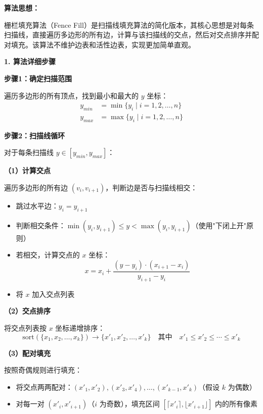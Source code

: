 ﻿\documentclass[12pt,a4paper]{article}
\begin{document}
\begin{tcolorbox}[breakable]
\textbf{算法思想：}

栅栏填充算法（Fence Fill）是扫描线填充算法的简化版本，其核心思想是对每条扫描线，直接遍历多边形的所有边，计算与该扫描线的交点，然后对交点排序并配对填充。该算法不维护边表和活性边表，实现更加简单直观。

\textbf{1. 算法详细步骤}

\textbf{步骤1：确定扫描范围}

遍历多边形的所有顶点，找到最小和最大的 $y$ 坐标：
\begin{align}
y_{min} &= \min\{y_i \mid i = 1, 2, \ldots, n\} \\
y_{max} &= \max\{y_i \mid i = 1, 2, \ldots, n\}
\end{align}

\textbf{步骤2：扫描线循环}

对于每条扫描线 $y \in [y_{min}, y_{max}]$：

\textbf{（1）计算交点}

遍历多边形的所有边 $(v_i, v_{i+1})$，判断边是否与扫描线相交：
\begin{itemize}
\item 跳过水平边：$y_i = y_{i+1}$
\item 判断相交条件：$\min(y_i, y_{i+1}) \leq y < \max(y_i, y_{i+1})$（使用"下闭上开"原则）
\item 若相交，计算交点的 $x$ 坐标：
  \begin{equation}
  x = x_i + \frac{(y - y_i) \cdot (x_{i+1} - x_i)}{y_{i+1} - y_i}
  \end{equation}
\item 将 $x$ 加入交点列表
\end{itemize}

\textbf{（2）交点排序}

将交点列表按 $x$ 坐标递增排序：
\begin{equation}
\text{sort}(\{x_1, x_2, \ldots, x_k\}) \rightarrow \{x'_1, x'_2, \ldots, x'_k\} \quad \text{其中} \quad x'_1 \leq x'_2 \leq \cdots \leq x'_k
\end{equation}

\textbf{（3）配对填充}

按照奇偶规则进行填充：
\begin{itemize}
\item 将交点两两配对：$(x'_1, x'_2), (x'_3, x'_4), \ldots, (x'_{k-1}, x'_k)$（假设 $k$ 为偶数）
\item 对每一对 $(x'_i, x'_{i+1})$（$i$ 为奇数），填充区间 $[\lceil x'_i \rceil, \lfloor x'_{i+1} \rfloor]$ 内的所有像素
\end{itemize}


\end{tcolorbox}
\end{document}
